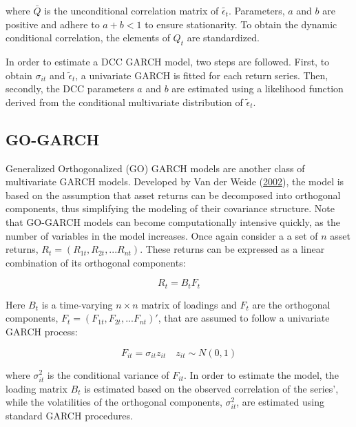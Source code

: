 \documentclass[11pt,preprint, authoryear]{elsarticle}
\numberwithin{equation}{section}
\numberwithin{figure}{section}
\numberwithin{table}{section}
\begin{document}
where \(\bar{Q}\) is the unconditional correlation matrix of
\(\tilde{\epsilon_t}\). Parameters, \(a\) and \(b\) are positive and
adhere to \(a + b < 1\) to ensure stationarity. To obtain the dynamic
conditional correlation, the elements of \(Q_t\) are standardized.

In order to estimate a DCC GARCH model, two steps are followed. First,
to obtain \(\sigma_{it}\) and \(\tilde{\epsilon}_t\), a univariate GARCH
is fitted for each return series. Then, secondly, the DCC parameters
\(a\) and \(b\) are estimated using a likelihood function derived from
the conditional multivariate distribution of \(\tilde{\epsilon}_t\).

\hypertarget{go-garch}{%
\subsection{GO-GARCH}\label{go-garch}}

Generalized Orthogonalized (GO) GARCH models are another class of
multivariate GARCH models. Developed by Van der Weide
(\protect\hyperlink{ref-VanDerWeide2002}{2002}), the model is based on
the assumption that asset returns can be decomposed into orthogonal
components, thus simplifying the modeling of their covariance structure.
Note that GO-GARCH models can become computationally intensive quickly,
as the number of variables in the model increases. Once again consider a
a set of \(n\) asset returns, \(R_t = (R_{1t}, R_{2t}, ... R_{nt})\).
These returns can be expressed as a linear combination of its orthogonal
components:

\begin{equation}
R_t = B_t F_t \label{eq4}
\end{equation}

Here \(B_t\) is a time-varying \(n \times n\) matrix of loadings and
\(F_t\) are the orthogonal components,
\(F_t = (F_{1t}, F_{2t}, ... F_{nt})'\), that are assumed to follow a
univariate GARCH process:

\begin{equation}
F_{it} = \sigma_{it}z_{it} \quad z_{it} \sim N(0,1)\label{eq5}
\end{equation}

where \(\sigma^2_{it}\) is the conditional variance of \(F_{it}\). In
order to estimate the model, the loading matrix \(B_t\) is estimated
based on the observed correlation of the series', while the volatilities
of the orthogonal components, \(\sigma^2_{it}\), are estimated using
standard GARCH procedures.
\end{document}
